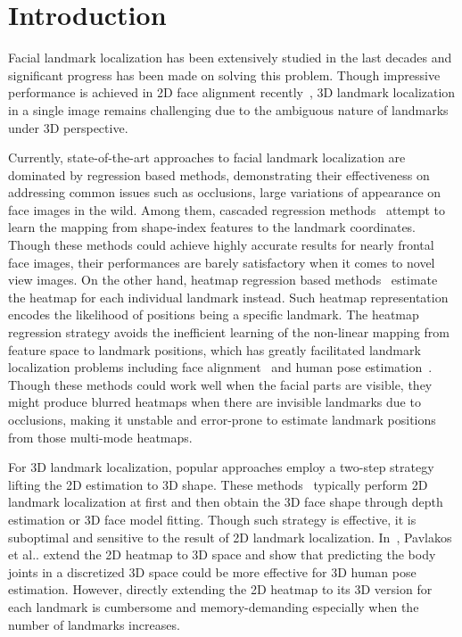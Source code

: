 \documentclass[a4paper,conference]{IEEEtran}
\makeatletter
\DeclareRobustCommand\onedot{\futurelet\@let@token\@onedot}
\def\@onedot{\ifx\@let@token.\else.\null\fi\xspace}
\def\etal{{et al}\onedot}
\makeatother
\begin{document}
\IEEEpeerreviewmaketitle



\section{Introduction}
Facial landmark localization has been extensively studied in the last decades and significant progress has been made on solving this problem.
Though impressive performance is achieved in 2D face alignment recently~\cite{bulat2016convolutional,Bulat2017HowFar}, 3D landmark localization in a single image remains challenging due to the ambiguous nature of landmarks under 3D perspective.

Currently, state-of-the-art approaches to facial landmark localization are dominated by regression based methods, demonstrating their effectiveness on addressing common issues such as occlusions, large variations of appearance on face images in the wild. 
Among them, cascaded regression methods~\cite{xiong2013supervised,cao2014face,ren2014face} attempt to learn the mapping from shape-index features to the landmark coordinates.
Though these methods could achieve highly accurate results for nearly frontal face images, their performances are barely satisfactory when it comes to novel view images.
On the other hand, heatmap regression based methods~\cite{bulat2016convolutional,Bulat2017HowFar} estimate the heatmap for each individual landmark instead. Such heatmap representation encodes the likelihood of positions being a specific landmark.
The heatmap regression strategy avoids the inefficient learning of the non-linear mapping from feature space to landmark positions, which has greatly facilitated landmark localization problems including face alignment~\cite{bulat2016convolutional,Bulat2017HowFar} and human pose estimation~\cite{bulat2016human,newell2016stacked}.
Though these methods could work well when the facial parts are visible, they might produce blurred heatmaps when there are invisible landmarks due to occlusions, making it unstable and error-prone to estimate landmark positions from those multi-mode heatmaps.

For 3D landmark localization, popular approaches employ a two-step strategy lifting the 2D estimation to 3D shape.
These methods~\cite{zhao2016fast,bulat2016two,gou2016shape} typically perform 2D landmark localization at first and then obtain the 3D face shape through depth estimation or 3D face model fitting.
Though such strategy is effective, it is suboptimal and sensitive to the result of 2D landmark localization.
In~\cite{pavlakos2017coarse}, Pavlakos \etal extend the 2D heatmap to 3D space and show that predicting the body joints in a discretized 3D space could be more effective for 3D human pose estimation. 
However, directly extending the 2D heatmap to its 3D version for each landmark is cumbersome and memory-demanding especially when the number of landmarks increases.
\end{document}
